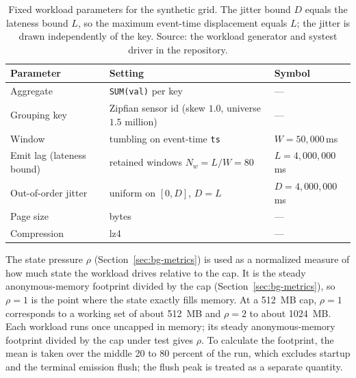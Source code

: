 \begin{table}[ht]
\centering
\small
\begin{tabular}{|>{\raggedright\arraybackslash}p{4.6cm}|>{\raggedright\arraybackslash}p{5.4cm}|>{\raggedright\arraybackslash}l|}
\hline
\textbf{Parameter} & \textbf{Setting} & \textbf{Symbol} \\
\hline
Aggregate & \texttt{SUM(val)} per key & --- \\
\hline
Grouping key & Zipfian sensor id (skew $1.0$, universe $1.5$ million) & --- \\
\hline
Window & tumbling on event-time \texttt{ts} & $W = 50{,}000$\,ms \\
\hline
Emit lag (lateness bound) & retained windows $N_w = L/W = 80$ & $L = 4{,}000{,}000$\,ms \\
\hline
Out-of-order jitter & uniform on $[0, D]$, $D = L$ & $D = 4{,}000{,}000$\,ms \\
\hline
Page size & 8192 bytes & --- \\
\hline
Compression & lz4 & --- \\
\hline
\end{tabular}
\caption[Fixed workload parameters]{Fixed workload parameters for the synthetic grid. The jitter bound $D$
equals the lateness bound $L$, so the maximum event-time displacement equals $L$;
the jitter is drawn independently of the key. Source: the workload generator and
systest driver in the repository.}
\label{tab:workload}
\end{table}

The state pressure $\rho$ (Section~\ref{sec:bg-metrics}) is used as a normalized measure of how much state the workload drives relative to the cap.
It is the steady anonymous-memory footprint divided by the cap (Section~\ref{sec:bg-metrics}), so $\rho = 1$ is the point where the state exactly fills memory.
At a 512\, MB cap, $\rho = 1$ corresponds to a working set of about 512\, MB and $\rho = 2$ to about 1024\, MB.
Each workload runs once uncapped in memory; its steady anonymous-memory footprint divided by the cap under test gives $\rho$.
To calculate the footprint, the mean is taken over the middle 20 to 80 percent of the run, which excludes startup and the terminal emission flush; the flush peak is treated as a separate quantity.

